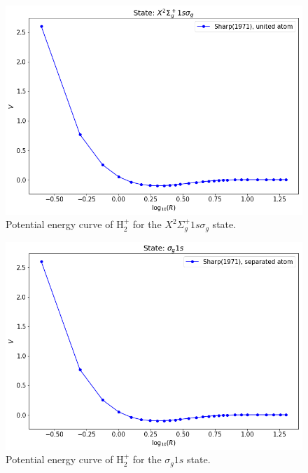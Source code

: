 \documentclass[12pt]{article}
\begin{document}
\iffalse %
\begin{figure}[h]
    \centering
    \includegraphics[scale=0.5]{img/H2plus_X2sigmagplus_Sharp(1971).png}
    \caption{Potential energy curve of H$_2^+$ for the $X^2\Sigma_g^+ 1s \sigma_g$ state.}
    \label{fig:h2+1}
\end{figure}
\begin{figure}[h]
    \centering
    \includegraphics[scale=0.5]{img/H2plus_sigmag1s_Sharp(1971).png}
    \caption{Potential energy curve of H$_2^+$ for the $\sigma_g 1s$ state.}
    \label{fig:h2+2}
\end{figure}
\end{document}
